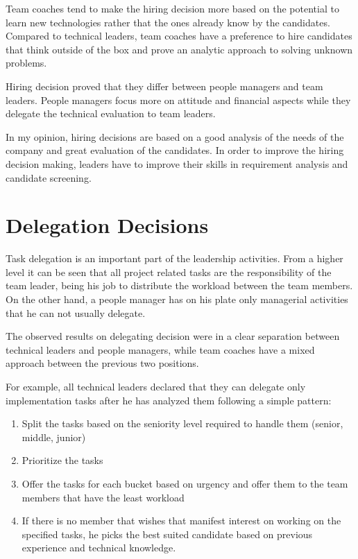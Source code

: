 Team coaches tend to make the hiring decision more based on the potential to learn new technologies rather that the ones already know by the candidates. Compared to technical leaders, team coaches have a preference to hire candidates that think outside of the box and prove an analytic approach to solving unknown problems.

Hiring decision proved that they differ between people managers and team leaders. People managers focus more on attitude and financial aspects while they delegate the technical evaluation to team leaders. 

In my opinion, hiring decisions are based on a good analysis of the needs of the company and great evaluation of the candidates. In order to improve the hiring decision making, leaders have to improve their skills in requirement analysis and candidate screening.

\section{Delegation Decisions}
\label{sec:delegation}
Task delegation is an important part of the leadership activities. From a higher level it can be seen that all project related tasks are the responsibility of the team leader, being his job to distribute the workload between the team members. On the other hand, a people manager has on his plate only managerial activities that he can not usually delegate.

The observed results on delegating decision were in a clear separation between technical leaders and people managers, while team coaches have a mixed approach between the previous two positions.

For example, all technical leaders declared that they can delegate only implementation tasks after he has analyzed them following a simple pattern:
\begin{enumerate}
\item Split the tasks based on the seniority level required to handle them (senior, middle, junior)
\item Prioritize the tasks
\item Offer the tasks for each bucket based on urgency and offer them to the team members that have the least workload
\item If there is no member that wishes that manifest interest on working on the specified tasks, he picks the best suited candidate based on previous experience and technical knowledge.
\end{enumerate}

